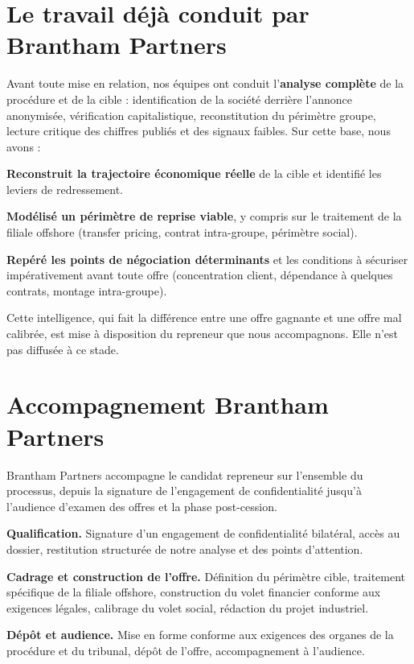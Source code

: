\documentclass[11pt,a4paper]{article}
\begin{document}
\section{Le travail déjà conduit par Brantham Partners}

Avant toute mise en relation, nos équipes ont conduit l'\textbf{analyse complète} de la procédure et de la cible : identification de la société derrière l'annonce anonymisée, vérification capitalistique, reconstitution du périmètre groupe, lecture critique des chiffres publiés et des signaux faibles. Sur cette base, nous avons :

\textbf{Reconstruit la trajectoire économique réelle} de la cible et identifié les leviers de redressement.

\textbf{Modélisé un périmètre de reprise viable}, y compris sur le traitement de la filiale offshore (transfer pricing, contrat intra-groupe, périmètre social).

\textbf{Repéré les points de négociation déterminants} et les conditions à sécuriser impérativement avant toute offre (concentration client, dépendance à quelques contrats, montage intra-groupe).

Cette intelligence, qui fait la différence entre une offre gagnante et une offre mal calibrée, est mise à disposition du repreneur que nous accompagnons. Elle n'est pas diffusée à ce stade.

\section{Accompagnement Brantham Partners}

Brantham Partners accompagne le candidat repreneur sur l'ensemble du processus, depuis la signature de l'engagement de confidentialité jusqu'à l'audience d'examen des offres et la phase post-cession.

\textbf{Qualification.} Signature d'un engagement de confidentialité bilatéral, accès au dossier, restitution structurée de notre analyse et des points d'attention.

\textbf{Cadrage et construction de l'offre.} Définition du périmètre cible, traitement spécifique de la filiale offshore, construction du volet financier conforme aux exigences légales, calibrage du volet social, rédaction du projet industriel.

\textbf{Dépôt et audience.} Mise en forme conforme aux exigences des organes de la procédure et du tribunal, dépôt de l'offre, accompagnement à l'audience.
\end{document}
